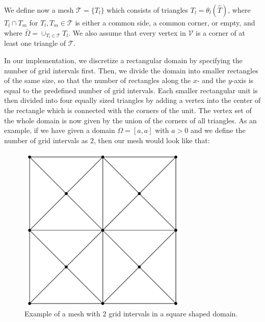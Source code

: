 We define now a mesh $\mathcal{T}=\{T_l\}$ which consists of triangles $T_l=\theta_l(\hat{T})$, where $T_l\cap T_m$ for $T_l,T_m\in\mathcal{T}$ is either a common side, a common corner, or empty, and where $\bar{\Omega}=\cup_{T_l\in\mathcal{T}}T_l$. We also assume that every vertex in $\mathcal{V}$ is a corner of at least one triangle of $\mathcal{T}$.

In our implementation, we discretize a rectangular domain by specifying the number of grid intervals first. Then, we divide the domain into smaller rectangles of the same size, so that the number of rectangles along the $x$- and the $y$-axis is equal to the predefined number of grid intervals. Each smaller rectangular unit is then divided into four equally sized triangles by adding a vertex into the center of the rectangle which is connected with the corners of the unit. The vertex set of the whole domain is now given by the union of the corners of all triangles. As an example, if we have given a domain $\Omega = [a, a]$ with $a>0$ and we define the number of grid intervals as $2$, then our mesh would look like that:
\begin{figure}
    \centering
    \includegraphics[height=8cm]{mesh.png} 
    \caption{Example of a mesh with $2$ grid intervals in a square shaped domain.}
\end{figure}


